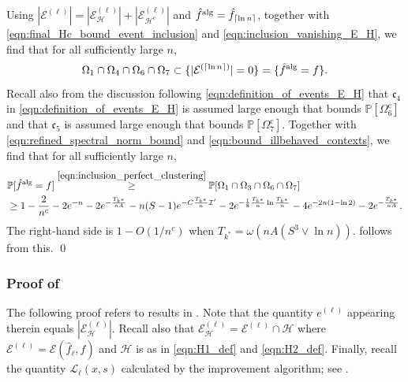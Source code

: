 \documentclass[11pt]{article}
\newcommand{\mf}[1]{\mathfrak{#1}}
\newcommand{\mcE}{\mathcal{E}}
\newcommand{\mcH}{\mathcal{H}}
\newcommand{\mcI}{\mathcal{I}}
\newcommand{\mcL}{\mathcal{L}}
\newcommand{\mbbP}{\mathbb{P}}
\newcommand{\alg}{\textnormal{alg}}
\DeclarePairedDelimiter\ceil{\lceil}{\rceil}
\theoremstyle{definition}
\theoremstyle{definition}
\begin{document}
Using $|\mcE^{(\ell)}|=|\mcE^{(\ell)}_{\mcH}|+|\mcE^{(\ell)}_{\mcH^{\mathrm{c}}}|$ and $\hat{f}^{\alg}=\hat{f}_{\ceil{\ln n}}$, together with \eqref{eqn:final_Hc_bound_event_inclusion} and \eqref{eqn:inclusion_vanishing_E_H}, we find that for all sufficiently large $n$,
\begin{equation}
	\label{eqn:inclusion_perfect_clustering}
	\Omega_1\cap\Omega_4\cap\Omega_6\cap\Omega_7
	\subset
	\{
	|\mcE^{(\ceil{\ln n})}|
	=
	0
	\}
	=
	\{
	\hat{f}^{\alg}
	=
	f
	\}
	.
\end{equation}
Recall also from the discussion following \eqref{eqn:definition_of_events_E_H} that $\mf{c}_4$ in \eqref{eqn:definition_of_events_E_H} is assumed large enough that \cite[Proposition 24]{Jedra:2022} bounds $\mbbP[\Omega_6^{\mathrm{c}}]$ and that $\mf{c}_5$ is assumed large enough that \cite[Lemma 17]{Jedra:2022} bounds $\mbbP[\Omega_7^{\mathrm{c}}]$.
Together with \eqref{eqn:refined_spectral_norm_bound} and \eqref{eqn:bound_illbehaved_contexts}, we find that for all sufficiently large $n$,
\begin{equation}
	\begin{split}
		 &
		\mbbP[\hat{f}^{\alg}=f]
		\overset{\eqref{eqn:inclusion_perfect_clustering}}{\geq}
		\mbbP[\Omega_1\cap\Omega_3\cap\Omega_6\cap\Omega_7]
		\\
		 &
		\geq
		1
		-
		\frac{2}{n^c}
		-
		2e^{-n}-2e^{-\frac{T_{k^*}}{nA}}
		-
		n(S-1)e^{-C\frac{T_{k^*}}{n}\mcI'}
		-
		2e^{-\frac{1}{8}\frac{T_{k^*}}{n}\ln \frac{T_{k^*}}{n}}
		-
		4e^{-2n(1-\ln 2)}
		-
		2e^{-\frac{T_{k^*}}{nA}}
		.
	\end{split}
\end{equation}
The right-hand side is $1-O(1/n^c)$ when $T_{k^*} = \omega(nA(S^3\vee\ln n))$.
 follows from this.
\qed

\subsubsection{Proof of \texorpdfstring{}{lemma}}
\label{sec:proof_of_bound_on_one_step_improvement_error_rate}

The following proof refers to results in \cite[Appendices G.2 and G.4]{Jedra:2022}.
Note that the quantity $e^{(\ell)}$ appearing therein equals $|\mcE^{(\ell)}_{\mcH}|$.
Recall also that $\mcE_{\mcH}^{(\ell)}=\mcE^{(\ell)}\cap\mcH$ where $\mcE^{(\ell)}=\mcE(\hat{f}_{\ell},f)$ and $\mcH$ is as in \eqref{eqn:H1_def} and \eqref{eqn:H2_def}.
Finally, recall the quantity $\mcL_{\ell}(x,s)$ calculated by the improvement algorithm; see .
\end{document}
